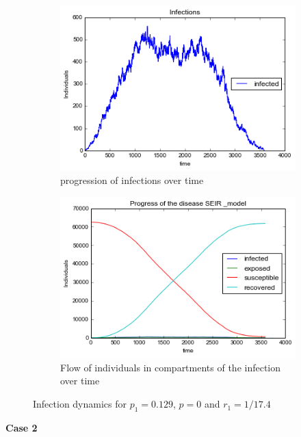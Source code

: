 \begin{figure}[h!]
    \centering
    \begin{subfigure}[b]{0.45\textwidth}
        \includegraphics[width=\textwidth]{images/1infections}
        \caption{ progression of infections over time}
        \label{a1}
    \end{subfigure}
     \begin{subfigure}[b]{0.45\textwidth}
        \includegraphics[width=\textwidth]{images/1SEIRmodel}
        \caption{ Flow of individuals in compartments of the infection over time}
        \label{a2}
    \end{subfigure}
  \caption{Infection dynamics for $p_1 = 0.129$, $p=0$ and $r_1 = 1/17.4$ }
\end{figure}

\textbf{Case 2}

